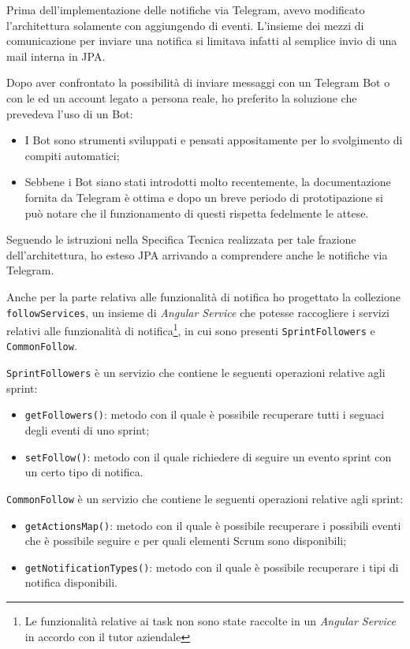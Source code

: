 Prima dell'implementazione delle notifiche via Telegram, avevo modificato
l'architettura solamente con aggiungendo di eventi. L'insieme dei mezzi di
comunicazione per inviare una notifica si limitava infatti al semplice invio
di una mail interna in JPA.

Dopo aver confrontato la possibilità di inviare messaggi con un Telegram Bot o
con le  ed un account legato a persona reale, ho preferito la
soluzione che prevedeva l'uso di un Bot:

\begin{itemize}
\item I Bot sono strumenti sviluppati e pensati appositamente per lo
  svolgimento di compiti automatici;
\item Sebbene i Bot siano stati introdotti molto recentemente, la
  documentazione fornita da Telegram è ottima e dopo un breve periodo di
  prototipazione si può notare che il funzionamento di questi rispetta
  fedelmente le attese.
\end{itemize}

Seguendo le istruzioni nella Specifica Tecnica realizzata per tale frazione
dell'architettura, ho esteso JPA arrivando a comprendere anche le notifiche
via Telegram.

Anche per la parte relativa alle funzionalità di notifica ho progettato la
collezione \texttt{followServices}, un insieme di \emph{Angular Service} che
potesse raccogliere i servizi relativi alle funzionalità di
notifica\footnote{Le funzionalità relative ai task non sono state raccolte in
un \emph{Angular Service} in accordo con il tutor aziendale}, in cui sono
presenti \texttt{SprintFollowers} e \texttt{CommonFollow}.

\texttt{SprintFollowers} è un servizio che contiene le seguenti operazioni
relative agli sprint:

\begin{itemize}
\item \texttt{getFollowers()}: metodo con il quale è possibile recuperare
  tutti i seguaci degli eventi di uno sprint;
\item \texttt{setFollow()}: metodo con il quale richiedere di seguire un
  evento sprint con un certo tipo di notifica.
\end{itemize}

\texttt{CommonFollow} è un servizio che contiene le seguenti operazioni
relative agli sprint:

\begin{itemize}
\item \texttt{getActionsMap()}: metodo con il quale è possibile recuperare i
  possibili eventi che è possibile seguire e per quali elementi Scrum sono
  disponibili;
\item \texttt{getNotificationTypes()}: metodo con il quale è possibile
  recuperare i tipi di notifica disponibili.
\end{itemize}

